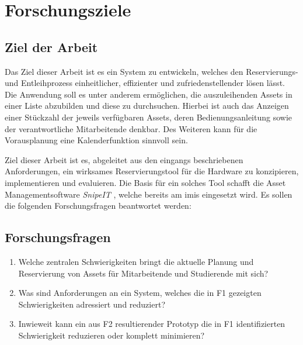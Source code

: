 
\chapter{Forschungsziele}


\section{Ziel der Arbeit}
Das Ziel dieser Arbeit ist es ein System zu entwickeln, welches den Reservierungs- und Entleihprozess einheitlicher, effizienter und zufriedenstellender lösen lässt. Die Anwendung soll es unter anderem ermöglichen, die auszuleihenden Assets in einer Liste abzubilden und diese zu durchsuchen.
Hierbei ist auch das Anzeigen einer Stückzahl der jeweils verfügbaren Assets, deren Bedienungsanleitung sowie der verantwortliche Mitarbeitende denkbar. Des Weiteren kann für die Vorausplanung
eine Kalenderfunktion sinnvoll sein.

Ziel dieser Arbeit ist es, abgeleitet aus den eingangs beschriebenen Anforderungen, ein wirksames
Reservierungstool für die Hardware zu konzipieren, implementieren und evaluieren. Die Basis für
ein solches Tool schafft die Asset Managementsoftware \textit{SnipeIT} \cite{noauthor_home_nodate}, welche bereits am \ac{imis} eingesetzt wird.
Es sollen die folgenden Forschungsfragen beantwortet werden:



\section{Forschungsfragen}
\begin{enumerate}
  \item[\sffamily\color{maincolor} {F1}] {Welche zentralen Schwierigkeiten bringt die aktuelle Planung und Reservierung von Assets für Mitarbeitende und Studierende mit sich?}
  \item[\sffamily\color{maincolor} {F2}] {Was sind Anforderungen an ein System, welches die in F1 gezeigten Schwierigkeiten adressiert und reduziert?}
  \item[\sffamily\color{maincolor} {F3}] {Inwieweit kann ein aus F2 resultierender Prototyp die in F1 identifizierten Schwierigkeit reduzieren oder komplett minimieren?}
\end{enumerate}


